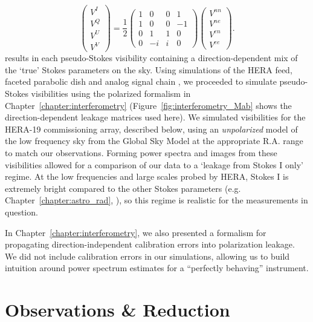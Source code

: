 \begin{equation}
\left(\begin{array}{c}
V^{I}\\
V^{Q}\\
V^{U}\\
V^{V}\end{array} \right)
= \frac{1}{2}
\left( \begin{array}{cccc}
1 & 0 & 0 & 1 \\
1 & 0 & 0 & -1 \\
0 & 1 & 1 & 0 \\
0 & -i & i & 0 \end{array} \right) 
\left(\begin{array}{c}
V^{nn}\\
V^{ne}\\
V^{en}\\
V^{ee}\end{array} \right) .
\label{eq:pseudo-stokes}
\end{equation}
results in each pseudo-Stokes visibility containing a direction-dependent mix of the `true' Stokes parameters on the sky. Using simulations of the HERA feed, faceted parabolic dish and analog signal chain \citep{Fagnoni.16}, we proceeded to simulate pseudo-Stokes visibilities using the polarized formalism in Chapter~\ref{chapter:interferometry} (Figure~\ref{fig:interferometry_Mab} shows the direction-dependent leakage matrices used here). 
We simulated visibilities for the HERA-19 commissioning array, described below, using an \textit{unpolarized} model of the low frequency sky from the Global Sky Model \citep[GSM;]{GSM.08, pygsm, GSM.17} at the appropriate R.A. range to match our observations. Forming power spectra and images from these visibilities allowed for a comparison of our data to a `leakage from Stokes I only' regime. At the low frequencies and large scales probed by HERA, Stokes I is extremely bright compared to the other Stokes parameters (e.g. Chapter~\ref{chapter:astro_rad}, \citet{Kohn.16}), so this regime is realistic for the measurements in question.

In Chapter~\ref{chapter:interferometry}, we also presented a formalism for propagating direction-independent calibration errors into polarization leakage. We did not include calibration errors in our simulations, allowing us to build intuition around power spectrum estimates for a ``perfectly behaving'' instrument.

\section{Observations \& Reduction}
\label{sec:hera19_obs}

